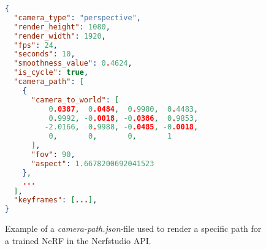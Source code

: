 \begin{figure}[ht]
\centering
\begin{lstlisting}[language=json,linewidth=0.9\linewidth]
{
  "camera_type": "perspective",
  "render_height": 1080,
  "render_width": 1920,
  "fps": 24,
  "seconds": 10,
  "smoothness_value": 0.4624,
  "is_cycle": true,
  "camera_path": [
    {
      "camera_to_world": [
          0.0387,  0.0484,  0.9980,  0.4483,
          0.9992, -0.0018, -0.0386,  0.9853,
         -2.0166,  0.9988, -0.0485, -0.0018,
          0,       0,       0,       1
      ],
      "fov": 90,
      "aspect": 1.6678200692041523
    },
    ...
  ],
  "keyframes": [...],
}

\end{lstlisting}
\caption{Example of a \textit{camera-path.json}-file used to render a specific path for a trained NeRF in the Nerfstudio API.}
\label{code:camera-path-example}
\end{figure}

